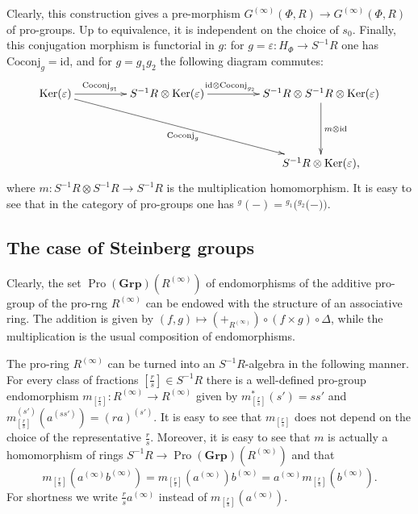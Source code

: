 \documentclass[oneside, 11pt]{amsart}
\numberwithin{equation}{section}
\theoremstyle{definition}
\theoremstyle{remark}
\DeclareMathOperator\Ker{Ker}
\DeclareMathOperator{\Pro}{Pro}
\newcommand{\Group}{\mathbf{Grp}}
\newcommand{\up}[2]{{^{#1}\!{#2}}}
\begin{document}
Clearly, this construction gives a pre-morphism \(G^{(\infty)}(\Phi, R) \to G^{(\infty)}(\Phi, R)\) of pro-groups. Up to equivalence, it is independent on the choice of \(s_0\). Finally, this conjugation morphism is functorial in \(g\): for \(g = \varepsilon \colon H_\Phi \to S^{-1} R\) one has \(\mathrm{Coconj}_g = \mathrm{id}\), and for \(g = g_1 g_2\) the following diagram commutes:
\[\xymatrix@+1.8pc{
\Ker(\varepsilon) \ar[r]^(.4){\mathrm{Coconj}_{g_{\scaleto{1}{2.5pt}}}} \ar[rrd]_{\mathrm{Coconj}_g} &
S^{-1} R \otimes \Ker(\varepsilon) \ar[r]^(0.41){\mathrm{id} \otimes \mathrm{Coconj}_{g_{\scaleto{2}{2.5pt}}}} &
S^{-1}R \otimes S^{-1} R \otimes \Ker(\varepsilon) \ar[d]^(0.5){m \otimes \mathrm{id}} \\
& & S^{-1} R \otimes \Ker(\varepsilon),
}\]
where \(m \colon S^{-1} R \otimes S^{-1} R \to S^{-1} R\) is the multiplication homomorphism. It is easy to see that in the category of pro-groups one has \(\up g{(-)} = \up{g_1}(\up{g_2}(-))\).

\subsection{The case of Steinberg groups}
Clearly, the set $\Pro(\Group)(R^{(\infty)})$ of endomorphisms of the additive pro-group of the pro-rng $R^{(\infty)}$ can be endowed with the structure of an associative ring. The addition is given by  $(f, g) \mapsto (+_{R^{(\infty)}}) \circ (f\times g) \circ \Delta$, while the multiplication is the usual composition of endomorphisms.

The pro-ring $R^{(\infty)}$ can be turned into an \(S^{-1} R\)-algebra in the following manner. For every class of fractions \([\frac rs] \in S^{-1} R\) there is a well-defined pro-group endomorphism \(m_{[\frac rs]} \colon R^{(\infty)} \to R^{(\infty)}\) given by \(m_{[\frac rs]}^*(s') = ss'\) and \(m_{[\frac rs]}^{(s')}(a^{(ss')}) = (ra)^{(s')}\). It is easy to see that $m_{[\frac{r}{s}]}$ does not depend on the choice of the representative \(\tfrac r s\). Moreover, it is easy to see that \(m\) is actually a homomorphism of rings \(S^{-1} R \to \Pro(\Group)(R^{(\infty)})\) and that 
\begin{equation} \label{eq:m-mult} m_{[\frac rs]}(a^{(\infty)} b^{(\infty)}) = m_{[\frac rs]}(a^{(\infty)}) b^{(\infty)} = a^{(\infty)} m_{[\frac rs]}(b^{(\infty)}).\end{equation}
For shortness we write \(\frac rs a^{(\infty)}\) instead of \(m_{[\frac rs]}(a^{(\infty)})\). 
\end{document}
